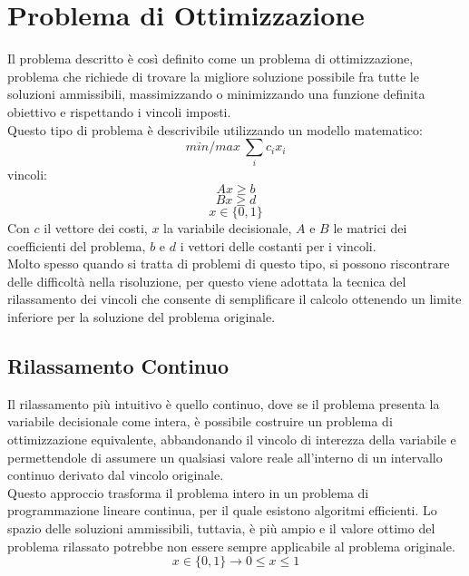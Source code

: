 \documentclass[12pt,a4paper,twoside]{report}
\begin{document}
	\section{Problema di Ottimizzazione}
	Il problema descritto è così definito come un problema di ottimizzazione, problema che richiede di trovare la migliore soluzione possibile fra tutte le soluzioni ammissibili, massimizzando o minimizzando una funzione definita obiettivo e rispettando i vincoli imposti. \smallskip \\
	Questo tipo di problema è descrivibile utilizzando un modello matematico:
	\begin{equation}
		min/max\ \sum_i c_ix_i
	\end{equation}
	vincoli:
	\begin{equation}
		Ax \geq  b
	\end{equation}
	\vspace{-0.6cm}
	\begin{equation}
		Bx \geq  d 
	\end{equation}
	\vspace{-0.6cm}
	\begin{equation}
		x \in \{0, 1\}
	\end{equation}
	Con $c$ il vettore dei costi, $x$ la variabile decisionale, $A$ e $B$ le matrici dei coefficienti del problema, $b$ e $d$ i vettori delle costanti per i vincoli.\smallskip \\
	Molto spesso quando si tratta di problemi di questo tipo, si possono riscontrare delle difficoltà nella risoluzione, per questo viene adottata la tecnica del rilassamento dei vincoli che consente di semplificare il calcolo ottenendo un limite inferiore per la soluzione del problema originale.
	\subsection{Rilassamento Continuo}
	Il rilassamento più intuitivo è quello continuo, dove se il problema presenta la variabile decisionale come intera, è possibile costruire un problema di ottimizzazione equivalente, abbandonando il vincolo di interezza della variabile e permettendole di assumere un qualsiasi valore reale all'interno di un intervallo continuo derivato dal vincolo originale. \smallskip \\
	Questo approccio trasforma il problema intero in un problema di programmazione lineare continua, per il quale esistono algoritmi efficienti. Lo spazio delle soluzioni ammissibili, tuttavia, è più ampio e il valore ottimo del problema rilassato potrebbe non essere sempre applicabile al problema originale.
	\begin{equation}
		x \in \{0, 1\}  \rightarrow 0 \leq	x \leq 1
	\end{equation}
\end{document}
